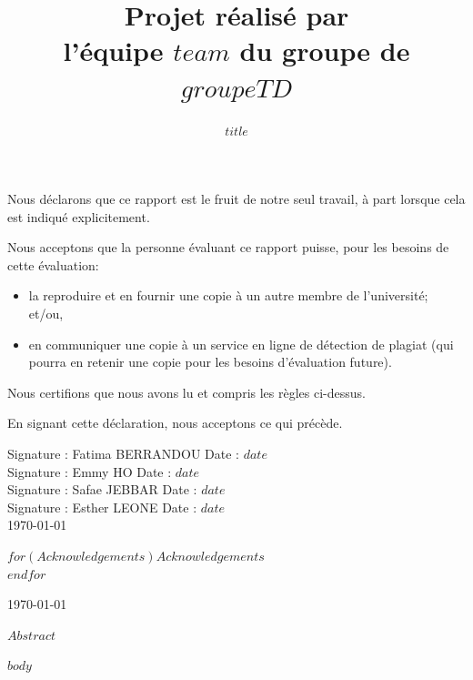 \documentclass[mstat,12pt]{unswthesis_v2}
\title{Projet réalisé par\\[0.5cm] l'équipe $team$ du groupe de $groupeTD$ }
\subtitle{$title$}
\author{\Authornameonly}
\begin{document}
\beforepreface




\vskip 2pc \noindent Nous déclarons que ce rapport est le fruit de notre seul travail, à part lorsque cela est indiqué  explicitement. 

\vskip 2pc  \noindent Nous acceptons que la personne évaluant ce rapport puisse, pour les besoins de cette évaluation:
\begin{itemize}
\item la reproduire et en fournir une copie à un autre membre de l'université; et/ou,
\item en communiquer une copie à un service en ligne de détection de plagiat (qui pourra en retenir une copie pour les besoins d'évaluation future).
\end{itemize}

\vskip 2pc \noindent Nous certifions que nous avons lu et compris les règles ci-dessus.\vspace{24pt}

\vskip 2pc \noindent En signant cette déclaration, nous acceptons ce qui précède.
\vskip 2pc \noindent



Signature : Fatima BERRANDOU \hfill Date : $date$ \\[1cm]
Signature : Emmy HO \hfill Date : $date$ \\[1cm]
Signature : Safae JEBBAR \hfill Date : $date$ \\[1cm]
Signature : Esther LEONE \hfill Date : $date$ \\[1cm]


{\bigskip\bigskip\bigskip\noindent} \today




{\bigskip}$for(Acknowledgements)$$Acknowledgements$\\[1cm] $endfor$

{\bigskip\bigskip\bigskip\noindent} \today




$Abstract$



\afterpreface





%
%






$body$
\end{document}
